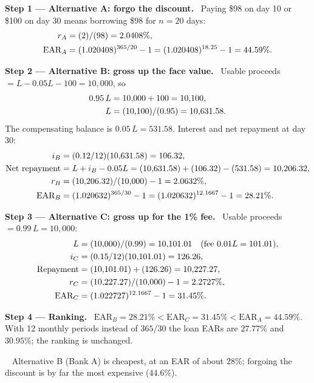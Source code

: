 \documentclass[11pt,a4paper]{article}
\newcommand{\step}[2]{\par\medskip\noindent\textbf{Step #1 --- #2.}~}
\newcommand{\answer}[1]{\par\smallskip\noindent\fbox{\textbf{Answer #1.}}~}
\begin{document}
\step{1}{Alternative A: forgo the discount}
Paying \$98 on day 10 or \$100 on day 30 means borrowing \$98 for $n = 20$ days:
\begin{align}
  r_A &= (2)/(98) = 2.0408\%, \notag\\
  \text{EAR}_A &= (1.020408)^{365/20} - 1 = (1.020408)^{18.25} - 1 = 44.59\%. \label{r5be9-a}
\end{align}

\step{2}{Alternative B: gross up the face value}
Usable proceeds $= L - 0.05L - 100 = 10{,}000$, so
\begin{align}
  0.95\,L &= 10{,}000 + 100 = 10{,}100, \notag\\
  L &= (10{,}100)/(0.95) = 10{,}631.58. \notag
\end{align}
The compensating balance is $0.05\,L = 531.58$. Interest and net repayment at day 30:
\begin{align}
  i_B &= (0.12/12)(10{,}631.58) = 106.32, \notag\\
  \text{Net repayment} &= L + i_B - 0.05L = (10{,}631.58) + (106.32) - (531.58) = 10{,}206.32, \notag\\
  r_B &= (10{,}206.32)/(10{,}000) - 1 = 2.0632\%, \notag\\
  \text{EAR}_B &= (1.020632)^{365/30} - 1 = (1.020632)^{12.1667} - 1 = 28.21\%. \label{r5be9-b}
\end{align}

\step{3}{Alternative C: gross up for the 1\% fee}
Usable proceeds $= 0.99\,L = 10{,}000$:
\begin{align}
  L &= (10{,}000)/(0.99) = 10{,}101.01 \quad (\text{fee } 0.01L = 101.01), \notag\\
  i_C &= (0.15/12)(10{,}101.01) = 126.26, \notag\\
  \text{Repayment} &= (10{,}101.01) + (126.26) = 10{,}227.27, \notag\\
  r_C &= (10{,}227.27)/(10{,}000) - 1 = 2.2727\%, \notag\\
  \text{EAR}_C &= (1.022727)^{12.1667} - 1 = 31.45\%. \label{r5be9-c}
\end{align}

\step{4}{Ranking}
$\text{EAR}_B = 28.21\% < \text{EAR}_C = 31.45\% < \text{EAR}_A = 44.59\%$. With 12 monthly periods
instead of $365/30$ the loan EARs are $27.77\%$ and $30.95\%$; the ranking is unchanged.

\answer{\unskip} Alternative B (Bank A) is cheapest, at an EAR of about 28\%; forgoing the discount is by
far the most expensive (44.6\%).
\end{document}

